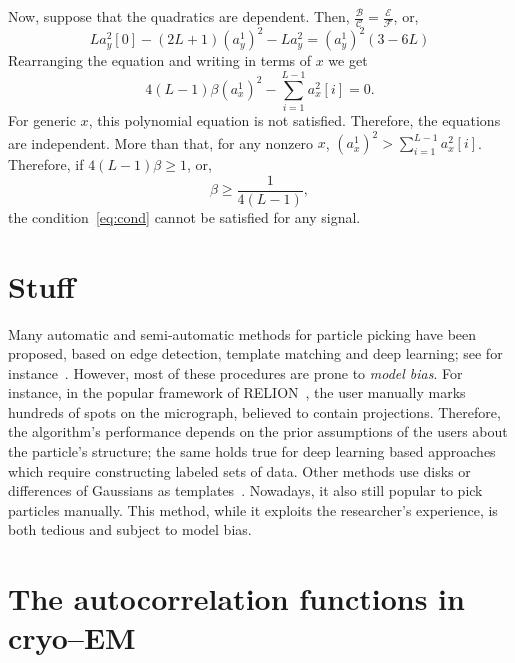 \documentclass[english,11pt]{article}
\newcommand{\1}{\mathbf{1}}
\numberwithin{equation}{section}
\theoremstyle{plain}
\theoremstyle{definition}
\theoremstyle{remark}
\theoremstyle{plain}
\theoremstyle{remark}
\theoremstyle{plain}
\theoremstyle{plain}
\begin{document}
Now, suppose that the quadratics are dependent. Then, $\frac{\mathcal{B}}{\mathcal{C}} =\frac{\mathcal{E}}{\mathcal{F}} $, or, 	
\begin{equation*}
La_y^2[0] - (2L+1)(a_y^1)^2 - La_y^2 = (a_y^1)^2(3-6L)
\end{equation*}
Rearranging the equation and writing in terms of $x$ we get 
\begin{equation} \label{eq:cond}
4(L-1)\beta (a_x^1)^2  - \sum_{i=1}^{L-1} a_x^2[i] = 0.
\end{equation}	
For generic $x$,  this polynomial equation is not satisfied. Therefore,  the equations are independent. 
More than that, for any nonzero $x$, $(a_x^1)^2 >\sum_{i=1}^{L-1} a_x^2[i]$. Therefore, if $4(L-1)\beta \geq 1$, or,
\begin{equation*}
\beta \geq \frac{1}{4(L-1)},
\end{equation*}
the condition~\eqref{eq:cond} cannot be satisfied for any signal. 


\section{Stuff}

Many automatic and semi-automatic methods for particle picking have been proposed, based on edge detection, template matching and deep learning; see for instance~\cite{harauz1989automatic,ogura2004automatic,zhu2016deep,frank1983automatic,scheres2015semi,heimowitz2018apple}. 
However, most of these procedures are prone to \emph{model bias}. For instance, in the popular framework of RELION~\cite{scheres2015semi}, the user manually marks hundreds of spots on the micrograph, believed to contain projections. 
Therefore, the algorithm's performance depends on the prior assumptions of the users about the particle's structure; the same holds true for deep learning based approaches which require constructing labeled sets of data.
Other methods use disks or differences of Gaussians as templates~\cite{langlois2014automated,voss2009dog}.
Nowadays, it also still popular to pick particles manually. This method, while it exploits the researcher's experience, is both tedious and subject to model bias.

\section{The autocorrelation functions in cryo--EM}
\end{document}
